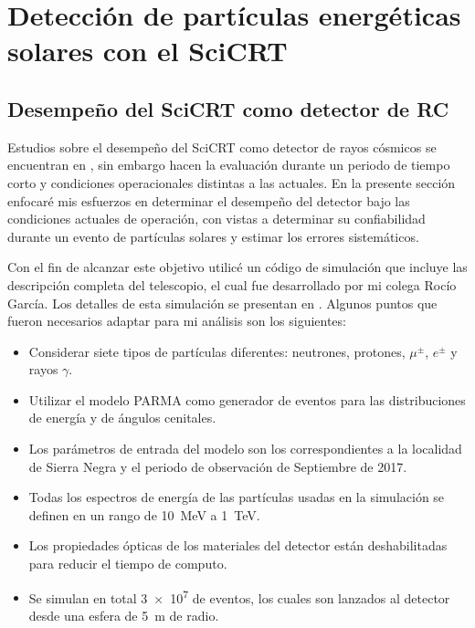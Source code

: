 
\chapter{Detección de partículas energéticas\\ solares con el SciCRT}
\label{chap:cuatro}
\section{Desempeño del SciCRT como detector de RC}

Estudios sobre el desempeño del SciCRT como detector de rayos cósmicos se encuentran en \cite{ynagai14,ysasai14}, sin embargo hacen la evaluación durante un periodo de tiempo corto y condiciones operacionales distintas a las actuales. En la presente sección enfocaré mis esfuerzos en determinar el desempeño del detector bajo las condiciones actuales de operación, con vistas a determinar su confiabilidad durante un evento de partículas solares y estimar los errores sistemáticos.

Con el fin de alcanzar este objetivo utilicé un código de simulación que incluye las descripción completa del telescopio, el cual fue desarrollado por mi colega Rocío García. Los detalles de esta simulación se presentan en \cite{garcia20}. Algunos puntos que fueron necesarios adaptar para mi análisis son los siguientes:

\begin{itemize}
  \item Considerar siete tipos de partículas diferentes: neutrones, protones, $\mu^{\pm}$, $e^{\pm}$ y rayos $\gamma$.
  \item Utilizar el modelo PARMA como generador de eventos para las distribuciones de energía y de ángulos cenitales.
  \item Los parámetros de entrada del modelo son los correspondientes a la localidad de Sierra Negra y el periodo de observación de Septiembre de \num{2017}.
  \item Todas los espectros de energía de las partículas usadas en la simulación se definen en un rango de \SI{10}{\mega\electronvolt} a \SI{1}{\tera\electronvolt}.
  \item Los propiedades ópticas de los materiales del detector están deshabilitadas para reducir el tiempo de computo.
  \item Se simulan en total \num{3e7} de eventos, los cuales son lanzados al detector desde una esfera de \SI{5}{\metre} de radio.
\end{itemize}

